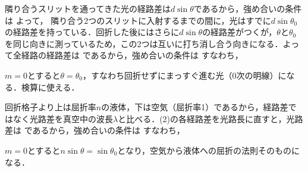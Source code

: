 \begin{reidaiunit}
\begin{kaitou}
\begin{komon}
 隣り合うスリットを通ってきた光の経路差は$d\sin\theta$であるから，強め合いの条件は
       よって，
 隣り合う2つのスリットに入射するまでの間に，光はすでに$d\sin\theta_0$の経路差を持っている．回折した後にはさらに$d\sin\theta$の経路差がつくが，$\theta$と$\theta_0$を同じ向きに測っているため，この2つは互いに打ち消し合う向きになる．よって全経路の経路差は
       であるから，強め合いの条件は
       すなわち，
       \begin{chuu}
       $m=0$とすると$\theta=\theta_0$，すなわち回折せずにまっすぐ進む光（0次の明線）になる．検算に使える．
       \end{chuu}
 回折格子より上は屈折率$n$の液体，下は空気（屈折率1）であるから，経路差ではなく光路差を真空中の波長$\lambda$と比べる．(2)の各経路差を光路長に直すと，光路差は
       であるから，強め合いの条件は
       すなわち，
       \begin{chuu}
       $m=0$とすると$n\sin\theta=\sin\theta_0$となり，空気から液体への屈折の法則そのものになる．
       \end{chuu}
\end{komon}
\end{kaitou}
\end{reidaiunit}
